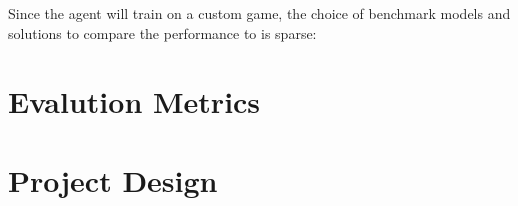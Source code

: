 \documentclass[a4paper,10pt]{article}
\begin{document}
Since the agent will train on a custom game, the choice of benchmark models and solutions to compare the performance to is sparse:




\section{Evalution Metrics}
% 
\section{Project Design}
% 






\end{document}
